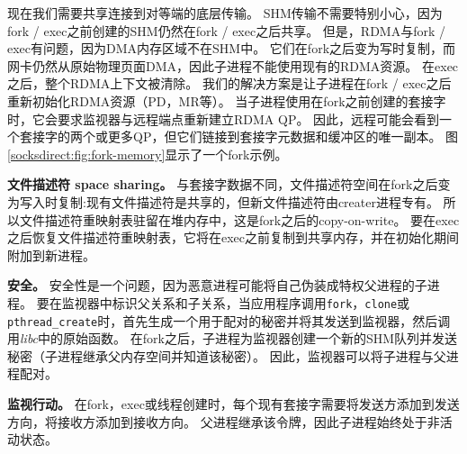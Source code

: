 现在我们需要共享连接到对等端的底层传输。
SHM传输不需要特别小心，因为fork / exec之前创建的SHM仍然在fork / exec之后共享。
但是，RDMA与fork / exec有问题，因为DMA内存区域不在SHM中。
它们在fork之后变为写时复制，而网卡仍然从原始物理页面DMA，因此子进程不能使用现有的RDMA资源。
在exec之后，整个RDMA上下文被清除。
我们的解决方案是让子进程在fork / exec之后重新初始化RDMA资源（PD，MR等）。
当子进程使用在fork之前创建的套接字时，它会要求监视器与远程端点重新建立RDMA QP。
因此，远程可能会看到一个套接字的两个或更多QP，但它们链接到套接字元数据和缓冲区的唯一副本。
图 \ref {socksdirect:fig:fork-memory}显示了一个fork示例。

\textbf {文件描述符 space sharing。}
与套接字数据不同，文件描述符空间在fork之后变为写入时复制:现有文件描述符是共享的，但新文件描述符由creater进程专有。
所以文件描述符重映射表驻留在堆内存中，这是fork之后的copy-on-write。
要在exec之后恢复文件描述符重映射表，它将在exec之前复制到共享内存，并在\libipc {}初始化期间附加到新进程。

\textbf{安全。}
安全性是一个问题，因为恶意进程可能将自己伪装成特权父进程的子进程。
要在监视器中标识父关系和子关系，当应用程序调用\texttt {fork}，\texttt {clone}或\texttt {pthread\_create}时，\libipc {}首先生成一个用于配对的秘密并将其发送到监视器，然后调用\emph {libc}中的原始函数。
在fork之后，子进程为监视器创建一个新的SHM队列并发送秘密（子进程继承父内存空间并知道该秘密）。
因此，监视器可以将子进程与父进程配对。

\textbf {监视行动。}
在fork，exec或线程创建时，每个现有套接字需要将发送方添加到发送方向，将接收方添加到接收方向。
父进程继承该令牌，因此子进程始终处于非活动状态。



